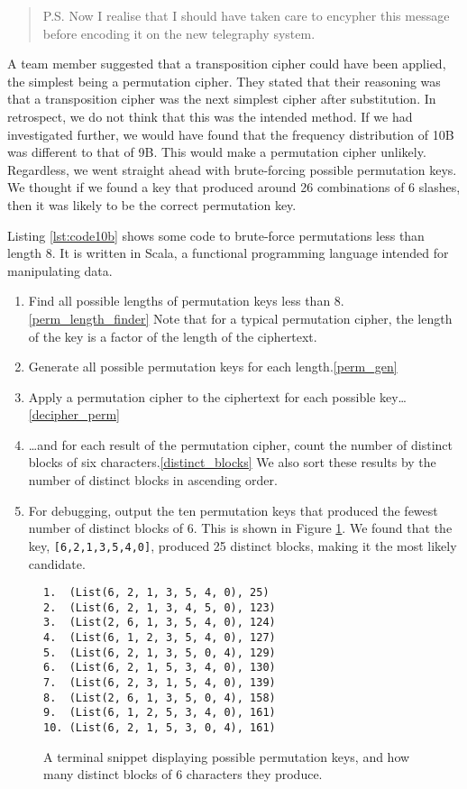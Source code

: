 \begin{quote}\ttfamily
    P.S. Now I realise that I should have taken care to encypher this message before 
    encoding it on the new telegraphy system.
\end{quote}

A team member suggested that a transposition cipher could have been applied, the simplest being a permutation cipher. They stated that their reasoning was that a transposition cipher was the next simplest cipher after substitution. In retrospect, we do not think that this was the intended method. If we had investigated further, we would have found that the frequency distribution of 10B was different to that of 9B. This would make a permutation cipher unlikely. Regardless, we went straight ahead with brute-forcing possible permutation keys. We thought if we found a key that produced around 26 combinations of 6 slashes, then it was likely to be the correct permutation key.

Listing \ref{lst:code10b} shows some code to brute-force permutations less than length 8. It is written in Scala, a functional programming language intended for manipulating data. 

\begin{enumerate}
    \item Find all possible lengths of permutation keys less than 8.\cref{perm_length_finder} Note that for a typical permutation cipher, the length of the key is a factor of the length of the ciphertext.
    \item Generate all possible permutation keys for each length.\cref{perm_gen}
    \item Apply a permutation cipher to the ciphertext for each possible key\ldots\cref{decipher_perm}
    \item \ldots and for each result of the permutation cipher, count the number of distinct blocks of six characters.\cref{distinct_blocks} We also sort these results by the number of distinct blocks in ascending order.
    \item For debugging, output the ten permutation keys that produced the fewest number of distinct blocks of 6. This is shown in Figure \ref{lst:terminalkeys}. We found that the key, \texttt{[6,2,1,3,5,4,0]}, produced 25 distinct blocks, making it the most likely candidate.
\end{enumerate}

\begin{figure}[H]
\centering
\begin{minipage}{38ex}
    \begin{verbatim}
1.  (List(6, 2, 1, 3, 5, 4, 0), 25) 
2.  (List(6, 2, 1, 3, 4, 5, 0), 123)
3.  (List(2, 6, 1, 3, 5, 4, 0), 124)
4.  (List(6, 1, 2, 3, 5, 4, 0), 127)
5.  (List(6, 2, 1, 3, 5, 0, 4), 129)
6.  (List(6, 2, 1, 5, 3, 4, 0), 130)
7.  (List(6, 2, 3, 1, 5, 4, 0), 139)
8.  (List(2, 6, 1, 3, 5, 0, 4), 158)
9.  (List(6, 1, 2, 5, 3, 4, 0), 161)
10. (List(6, 2, 1, 5, 3, 0, 4), 161)
    \end{verbatim}
\end{minipage}
\caption{A terminal snippet displaying possible permutation keys, and how many distinct blocks of 6 characters they produce.}
\label{lst:terminalkeys}
\end{figure}

